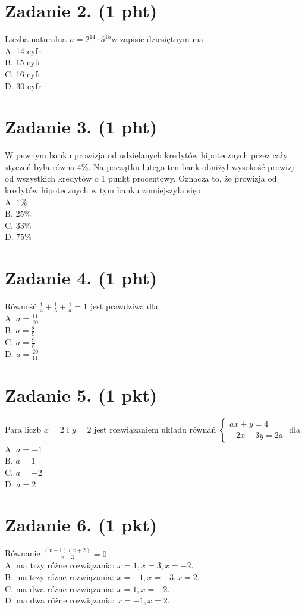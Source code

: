 \documentclass[10pt]{article}
\begin{document}
\section*{Zadanie 2. (1 pht)}
Liczba naturalna \(n=2^{14} \cdot 5^{15} \mathrm{w}\) zapisie dziesiętnym ma\\
A. 14 cyfr\\
B. 15 cyfr\\
C. 16 cyfr\\
D. 30 cyfr

\section*{Zadanie 3. (1 pht)}
W pewnym banku prowizja od udzielanych kredytów hipotecznych przez cały styczeń była równa \(4 \%\). Na początku lutego ten bank obniżył wysokość prowizji od wszystkich kredytów o 1 punkt procentowy. Oznacza to, że prowizja od kredytów hipotecznych w tym banku zmniejszyła sięo\\
A. \(1 \%\)\\
B. \(25 \%\)\\
C. \(33 \%\)\\
D. \(75 \%\)

\section*{Zadanie 4. (1 pht)}
Równość \(\frac{1}{4}+\frac{1}{5}+\frac{1}{a}=1\) jest prawdziwa dla\\
A. \(a=\frac{11}{20}\)\\
B. \(a=\frac{8}{9}\)\\
C. \(a=\frac{9}{8}\)\\
D. \(a=\frac{20}{11}\)

\section*{Zadanie 5. (1 pkt)}
Para liczb \(x=2\) i \(y=2\) jest rozwiązaniem układu równań \(\left\{\begin{array}{c}a x+y=4 \\ -2 x+3 y=2 a\end{array}\right.\) dla\\
A. \(a=-1\)\\
B. \(a=1\)\\
C. \(a=-2\)\\
D. \(a=2\)

\section*{Zadanie 6. (1 pkt)}
Równanie \(\frac{(x-1)(x+2)}{x-3}=0\)\\
A. ma trzy różne rozwiązania: \(x=1, x=3, x=-2\).\\
B. ma trzy różne rozwiązania: \(x=-1, x=-3, x=2\).\\
C. ma dwa różne rozwiązania: \(x=1, x=-2\).\\
D. ma dwa różne rozwiązania: \(x=-1, x=2\).
\end{document}
